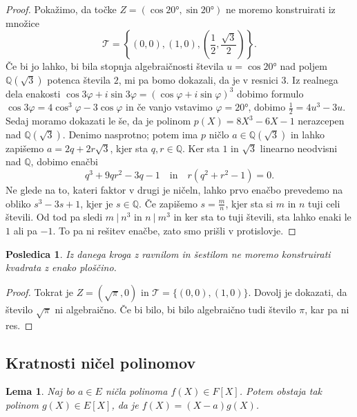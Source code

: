 \documentclass[10pt, a4paper]{article}
\newtheorem{posledica}[izr]{Posledica}
\newtheorem{lema}[izr]{Lema}
\newenvironment{noticeC}{%
  \tcolorbox[%
  notitle,
  empty,
  enhanced,  %
  breakable,
  coltext=black, 
  fontupper=\rmfamily,
  noparskip,
  sharp corners,
  boxrule=-1pt,  %
  frame hidden,
  left=7pt,  %
  right=7pt,
  top=5pt,
  bottom=5pt,
  before skip=2.5ex plus 2pt,
  after skip=2.5ex plus 2pt,
  overlay unbroken and last={%
  },
  ]}
{\endtcolorbox}
\newenvironment{dokaz}%
  {\begin{noticeC}\begin{proof}}%
  {\end{proof}\end{noticeC}}
\newcommand{\Q}{\mathbb {Q}}
\begin{document}
\begin{dokaz}
  Pokažimo, da točke $Z = (\cos \ang{20}, \sin \ang{20})$ ne moremo konstruirati iz množice 
  $$\mathcal{T} = \left\lbrace (0, 0), (1, 0), \left(\frac{1}{2}, \frac{\sqrt{3}}{2}\right) \right\rbrace.$$ 
  Če bi jo lahko, bi bila stopnja algebraičnosti števila $u = \cos \ang{20}$ nad poljem $\Q (\sqrt{3})$ potenca števila $2$,
  mi pa bomo dokazali, da je v resnici $3$. Iz realnega dela enakosti $\cos 3\varphi + i \sin 3\varphi = (\cos\varphi + i \sin \varphi)^3$
  dobimo formulo $\cos 3 \varphi = 4 \cos^3 \varphi - 3 \cos \varphi$ in če vanjo vstavimo $\varphi = \ang{20}$, 
  dobimo $\frac{1}{2} = 4 u^3 - 3u$. Sedaj moramo dokazati le še, da je polinom $p(X) = 8 X^3 - 6X - 1$ nerazcepen nad $\Q (\sqrt{3})$.
  Denimo nasprotno; potem ima $p$ ničlo $a \in \Q (\sqrt{3})$ in lahko zapišemo $a = 2q + 2r \sqrt{3}$, kjer sta $q, r \in \Q$.
  Ker sta $1$ in $\sqrt{3}$ linearno neodvisni nad $\Q$, dobimo enačbi 
  $$q^3 + 9 qr^2 - 3q - 1 \quad \mathrm{in} \quad r(q^2 + r^2 - 1) = 0.$$
  Ne glede na to, kateri faktor v drugi je ničeln, lahko prvo enačbo prevedemo na obliko $s^3 - 3s + 1$, kjer je $s \in \Q$.
  Če zapišemo $s = \frac{m}{n}$, kjer sta si $m$ in $n$ tuji celi števili. Od tod pa sledi 
  $m\ |\ n^3$ in $n\ |\ m^3$ in ker sta to tuji števili, sta lahko enaki le $1$ ali pa $-1$.
  To pa ni rešitev enačbe, zato smo prišli v protislovje.
\end{dokaz}

\begin{posledica}
  Iz danega kroga z ravnilom in šestilom ne moremo konstruirati kvadrata z enako ploščino.
\end{posledica}

\begin{dokaz}
  Tokrat je $Z = (\sqrt{\pi}, 0)$ in $\mathcal{T} = \{(0, 0), (1, 0)\}$. Dovolj je dokazati, da število $\sqrt{\pi}$
  ni algebraično. Če bi bilo, bi bilo algebraično tudi število $\pi$, kar pa ni res.
\end{dokaz}

\subsection{Kratnosti ničel polinomov}

\begin{lema}
  Naj bo $a \in E$ ničla polinoma $f(X) \in F[X]$. Potem obstaja tak polinom $g(X) \in E[X]$,
  da je $f(X) = (X - a) g(X)$.
\end{lema}
\end{document}
